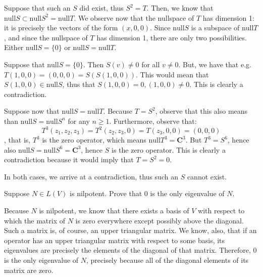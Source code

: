  \begin{solution}
     
     Suppose that such an $S$ did exist, thus $S^2 = T$. Then, we know that $\text{null} S \subset \text{null} S^2 = \text{null} T$. We observe now that the nullspace of $T$ has dimension 1: it is precisely the vectors of the form $(x, 0, 0)$. Since $\text{null} S$ is a subspace of $\text{null} T$, and since the nullspace of $T$ has dimension 1, there are only two possibilities. Either $\text{null} S = \{0\}$ or $\text{null} S = \text{null} T$.

     Suppose that $\text{null} S = \{0\}$. Then $S(v) \neq 0$ for all $v \neq 0$. But, we have that e.g. $T(1, 0, 0) = (0, 0, 0) = S(S(1, 0, 0))$. This would mean that $S(1, 0, 0) \in \text{null} S$, thus that $S(1, 0, 0) = 0, (1, 0, 0) \neq 0$. This is clearly a contradiction.

     Suppose now that $\text{null} S = \text{null} T$. Because $T = S^2$, observe that this also means than $\text{null} S = \text{null} S^n$ for any $n \geq 1$. Furthermore, observe that:
     $$T^3(z_1, z_2, z_3) = T^2(z_2, z_3, 0) = T(z_3, 0, 0) = (0, 0, 0)$$
     , that is, $T^3$ is the zero operator, which means $\text{null} T^3 = \mathbf{C}^3$. But $T^3 = S^6$, hence also $\text{null} S = \text{null} S^6 = \mathbf{C}^3$, hence $S$ is the zero operator. This is clearly a contradiction because it would imply that $T = S^2 = 0$. 

     In both cases, we arrive at a contradiction, thus such an $S$ cannot exist.
 \end{solution}

 \begin{exercise}{7}
    Suppose $N \in L(V)$ is nilpotent. Prove that 0 is the only eigenvalue of $N$.
 \end{exercise}

 \begin{solution}

     Because $N$ is nilpotent, we know that there exists a basis of $V$ with respect to which the matrix of $N$ is zero everywhere except possibly above the diagonal. Such a matrix is, of course, an upper triangular matrix. We know, also, that if an operator has an upper triangular matrix with respect to some basis, its eigenvalues are precisely the elements of the diagonal of that matrix. Therefore, 0 is the only eigenvalue of $N$, precisely because all of the diagonal elements of its matrix are zero.
 \end{solution}

